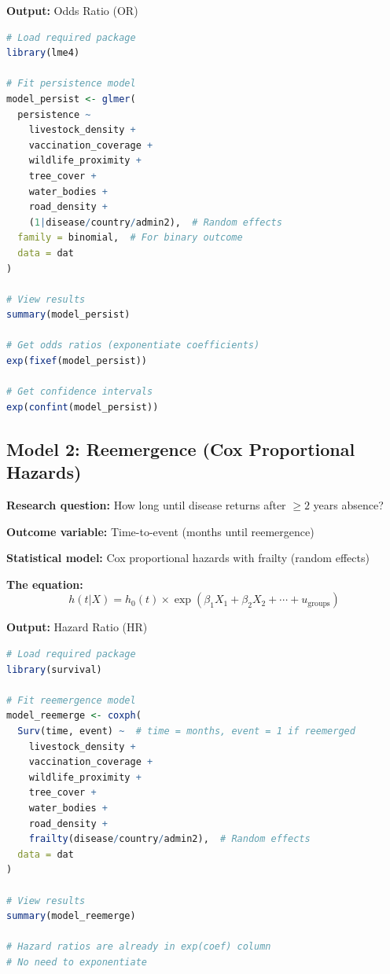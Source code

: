 \documentclass[11pt,a4paper]{article}
\begin{document}
\textbf{Output:} Odds Ratio (OR)

\begin{rcode}
\begin{lstlisting}[language=R]
# Load required package
library(lme4)

# Fit persistence model
model_persist <- glmer(
  persistence ~ 
    livestock_density + 
    vaccination_coverage + 
    wildlife_proximity + 
    tree_cover + 
    water_bodies + 
    road_density + 
    (1|disease/country/admin2),  # Random effects
  family = binomial,  # For binary outcome
  data = dat
)

# View results
summary(model_persist)

# Get odds ratios (exponentiate coefficients)
exp(fixef(model_persist))

# Get confidence intervals
exp(confint(model_persist))
\end{lstlisting}
\end{rcode}

\subsection{Model 2: Reemergence (Cox Proportional Hazards)}

\textbf{Research question:} How long until disease returns after $\geq 2$ years absence?

\textbf{Outcome variable:} Time-to-event (months until reemergence)

\textbf{Statistical model:} Cox proportional hazards with frailty (random effects)

\textbf{The equation:}
\begin{equation}
h(t|X) = h_0(t) \times \exp(\beta_1 X_1 + \beta_2 X_2 + \cdots + u_{\text{groups}})
\end{equation}

\textbf{Output:} Hazard Ratio (HR)

\begin{rcode}
\begin{lstlisting}[language=R]
# Load required package
library(survival)

# Fit reemergence model
model_reemerge <- coxph(
  Surv(time, event) ~  # time = months, event = 1 if reemerged
    livestock_density + 
    vaccination_coverage + 
    wildlife_proximity + 
    tree_cover + 
    water_bodies + 
    road_density + 
    frailty(disease/country/admin2),  # Random effects
  data = dat
)

# View results
summary(model_reemerge)

# Hazard ratios are already in exp(coef) column
# No need to exponentiate
\end{lstlisting}
\end{rcode}
\end{document}
